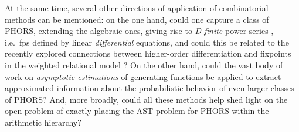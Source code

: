 At the same time, several other directions of application of combinatorial methods can be mentioned: on the one hand, could one capture a class of PHORS, extending the algebraic ones, giving rise to \emph{D-finite} power series \cite{DBLP:series/tmsc/KauersP11}, i.e.~fps defined by linear \emph{differential} equations, and could this be related to the recently explored connections between {higher-order differentiation} and fixpoints in the weighted relational model \cite{DBLP:conf/lics/GalalL24}?
On the other hand, could the vast body of work on \emph{asymptotic estimations} \cite{DBLP:books/daglib/0023751} of generating functions be applied to extract approximated  information about the probabilistic behavior of even larger classes of PHORS?
And, more broadly, could all these methods help shed light on 
the open problem of exactly placing the AST problem for PHORS within the arithmetic hierarchy?
%
%
%
%
%
%
%
%
%
%
